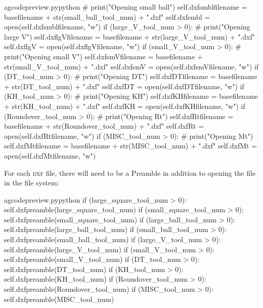 \documentclass{ltxdoc}
\begin{document}
\begin{writecode}{a}{gcodepreview.py}{python}
#                print("Opening small ball")
                self.dxfsmblfilename = basefilename + str(small_ball_tool_num) + ".dxf"
                self.dxfsmbl = open(self.dxfsmblfilename, "w")
            if (large_V_tool_num > 0):
#                print("Opening large V")
                self.dxflgVfilename = basefilename + str(large_V_tool_num) + ".dxf"
                self.dxflgV = open(self.dxflgVfilename, "w")
            if (small_V_tool_num > 0):
#                print("Opening small V")
                self.dxfsmVfilename = basefilename + str(small_V_tool_num) + ".dxf"
                self.dxfsmV = open(self.dxfsmVfilename, "w")
            if (DT_tool_num > 0):
#                print("Opening DT")
                self.dxfDTfilename = basefilename + str(DT_tool_num) + ".dxf"
                self.dxfDT = open(self.dxfDTfilename, "w")
            if (KH_tool_num > 0):
#                print("Opening KH")
                self.dxfKHfilename = basefilename + str(KH_tool_num) + ".dxf"
                self.dxfKH = open(self.dxfKHfilename, "w")
            if (Roundover_tool_num > 0):
#                print("Opening Rt")
                self.dxfRtfilename = basefilename + str(Roundover_tool_num) + ".dxf"
                self.dxfRt = open(self.dxfRtfilename, "w")
            if (MISC_tool_num > 0):
#                print("Opening Mt")
                self.dxfMtfilename = basefilename + str(MISC_tool_num) + ".dxf"
                self.dxfMt = open(self.dxfMtfilename, "w")
\end{writecode}
\addtocounter{gcpy}{79}

For each \textsc{dxf} file, there will need to be a Preamble in addition to opening the file in the file system:

\lstset{firstnumber=\thegcpy}
\begin{writecode}{a}{gcodepreview.py}{python}
            if (large_square_tool_num > 0):
                self.dxfpreamble(large_square_tool_num)
            if (small_square_tool_num > 0):
                self.dxfpreamble(small_square_tool_num)
            if (large_ball_tool_num > 0):
                self.dxfpreamble(large_ball_tool_num)
            if (small_ball_tool_num > 0):
                self.dxfpreamble(small_ball_tool_num)
            if (large_V_tool_num > 0):
                self.dxfpreamble(large_V_tool_num)
            if (small_V_tool_num > 0):
                self.dxfpreamble(small_V_tool_num)
            if (DT_tool_num > 0):
                self.dxfpreamble(DT_tool_num)
            if (KH_tool_num > 0):
                self.dxfpreamble(KH_tool_num)
            if (Roundover_tool_num > 0):
                self.dxfpreamble(Roundover_tool_num)
            if (MISC_tool_num > 0):
                self.dxfpreamble(MISC_tool_num)

\end{writecode}
\addtocounter{gcpy}{21}
\end{document}
